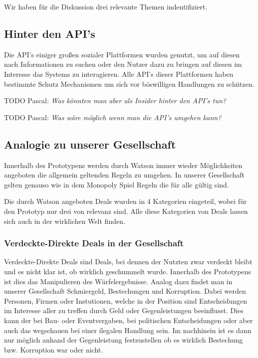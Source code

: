 \documentclass[german]{cgspaper} %
\newcommand{\todo}[1]{\textit{#1}}
\newcommand{\Pascal}[1]{\textcolor{colorPascal}{TODO Pascal:} \todo{#1} }
\begin{document}
Wir haben für die Diskussion drei relevante Themen indentifiziert.

\subsection{Hinter den API's}
Die API's einiger großen sozialer Plattformen wurden genutzt, um auf diesen nach Informationen zu suchen oder den Nutzer dazu zu bringen auf diesen im Interesse das Systems zu interagieren.
Alle API's dieser Plattformen haben bestimmte Schutz Mechanismen um sich vor böswilligen Handlungen zu schützen.

\Pascal{Was könnten man aber als Insider hinter den API's tun?}

\Pascal{Was wäre möglich wenn man die API's umgehen kann?}

\subsection{Analogie zu unserer Gesellschaft}

Innerhalb des Prototypens werden durch Watson immer wieder Möglichkeiten angeboten die allgemein geltenden Regeln zu umgehen.
In unserer Gesellschaft gelten genauso wie in dem Monopoly Spiel Regeln die für alle gültig sind.

Die durch Watson angeboten Deals wurden in 4 Kategorien eingeteil, wobei für den Prototyp nur drei von relevanz sind.
Alle diese Kategorien von Deals lassen sich auch in der wirklichen Welt finden.

\subsubsection{Verdeckte-Direkte Deals in der Gesellschaft}

Verdeckte-Direkte Deals sind Deals, bei dennen der Nutzten zwar verdeckt bleibt und es nicht klar ist, ob wirklich geschummelt wurde.
Innerhalb des Prototypens ist dies das Manipulieren des Würfelergebnisse. 
Analog dazu findet man in unserer Gesellschaft Schmiergeld, Bestechungen und Korruption.
Dabei werden Personen, Firmen oder Instutionen, welche in der Position sind Entscheidungen im Interesse aller zu treffen durch Geld oder Gegenleistungen beeinflusst.
Dies kann der bei Bau- oder Eventvergaben, bei politischen Entscheidungen oder aber auch das wegschauen bei einer ilegalen Handlung sein.
Im nachhinein ist es dann nur möglich anhand der Gegenleistung festzustellen ob es wirklich Bestechung bzw. Korruption war oder nicht.
\end{document}
